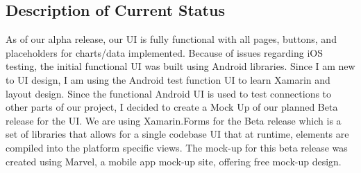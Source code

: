 \documentclass[letterpaper,10pt,titlepage,journal,compsoc,draftclsnofoot,onecolumn]{IEEEtran}
\begin{document}
\subsection{Description of Current Status}
As of our alpha release, our UI is fully functional with all pages, buttons, and placeholders for charts/data implemented. Because of issues regarding iOS testing, the initial functional UI was built using Android libraries. Since I am new to UI design, I am using the Android test function UI to learn Xamarin and layout design. Since the functional Android UI is used to test connections to other parts of our project, I decided to create a Mock Up of our planned Beta release for the UI. We are using Xamarin.Forms for the Beta release which is a set of libraries that allows for a single codebase UI that at runtime, elements are compiled into the platform specific views. The mock-up for this beta release was created using Marvel, a mobile app mock-up site, offering free mock-up design.
\end{document}
